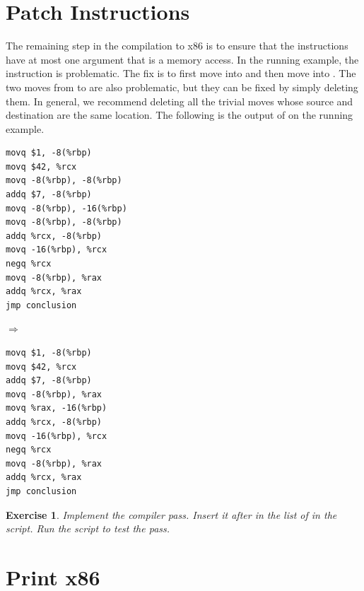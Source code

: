 \documentclass[11pt]{book}
\newtheorem{exercise}[theorem]{Exercise}
\begin{document}
\section{Patch Instructions}
\label{sec:patch-instructions}

The remaining step in the compilation to x86 is to ensure that the
instructions have at most one argument that is a memory access.
In the running example, the instruction 
is problematic. The fix is to first move 
into  and then move  into .
%
The two moves from  to  are also
problematic, but they can be fixed by simply deleting them. In
general, we recommend deleting all the trivial moves whose source and
destination are the same location.
%
The following is the output of  on the
running example.
\begin{center}
  \begin{minipage}{0.4\textwidth}
\begin{lstlisting}
movq $1, -8(%rbp)
movq $42, %rcx
movq -8(%rbp), -8(%rbp)
addq $7, -8(%rbp)
movq -8(%rbp), -16(%rbp)
movq -8(%rbp), -8(%rbp)
addq %rcx, -8(%rbp)
movq -16(%rbp), %rcx
negq %rcx
movq -8(%rbp), %rax
addq %rcx, %rax
jmp conclusion
\end{lstlisting}
\end{minipage}
$\Rightarrow\qquad$
\begin{minipage}{0.45\textwidth}
\begin{lstlisting}
movq $1, -8(%rbp)
movq $42, %rcx
addq $7, -8(%rbp)
movq -8(%rbp), %rax
movq %rax, -16(%rbp)
addq %rcx, -8(%rbp)
movq -16(%rbp), %rcx
negq %rcx
movq -8(%rbp), %rax
addq %rcx, %rax
jmp conclusion
\end{lstlisting}
\end{minipage}
\end{center}
  
\begin{exercise}\normalfont
%
Implement the  compiler pass.
%
Insert it after  in the list of 
in the  script.
%
Run the script to test the  pass.
\end{exercise}


\section{Print x86}
\label{sec:print-x86-reg-alloc}
\end{document}
